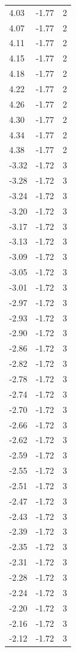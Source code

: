 \begin{longtable}{lrr}
  4.03 & -1.77 & 2 \\
  4.07 & -1.77 & 2 \\
  4.11 & -1.77 & 2 \\
  4.15 & -1.77 & 2 \\
  4.18 & -1.77 & 2 \\
  4.22 & -1.77 & 2 \\
  4.26 & -1.77 & 2 \\
  4.30 & -1.77 & 2 \\
  4.34 & -1.77 & 2 \\
  4.38 & -1.77 & 2 \\
  -3.32 & -1.72 & 3 \\
  -3.28 & -1.72 & 3 \\
  -3.24 & -1.72 & 3 \\
  -3.20 & -1.72 & 3 \\
  -3.17 & -1.72 & 3 \\
  -3.13 & -1.72 & 3 \\
  -3.09 & -1.72 & 3 \\
  -3.05 & -1.72 & 3 \\
  -3.01 & -1.72 & 3 \\
  -2.97 & -1.72 & 3 \\
  -2.93 & -1.72 & 3 \\
  -2.90 & -1.72 & 3 \\
  -2.86 & -1.72 & 3 \\
  -2.82 & -1.72 & 3 \\
  -2.78 & -1.72 & 3 \\
  -2.74 & -1.72 & 3 \\
  -2.70 & -1.72 & 3 \\
  -2.66 & -1.72 & 3 \\
  -2.62 & -1.72 & 3 \\
  -2.59 & -1.72 & 3 \\
  -2.55 & -1.72 & 3 \\
  -2.51 & -1.72 & 3 \\
  -2.47 & -1.72 & 3 \\
  -2.43 & -1.72 & 3 \\
  -2.39 & -1.72 & 3 \\
  -2.35 & -1.72 & 3 \\
  -2.31 & -1.72 & 3 \\
  -2.28 & -1.72 & 3 \\
  -2.24 & -1.72 & 3 \\
  -2.20 & -1.72 & 3 \\
  -2.16 & -1.72 & 3 \\
  -2.12 & -1.72 & 3 \\

\end{longtable}
